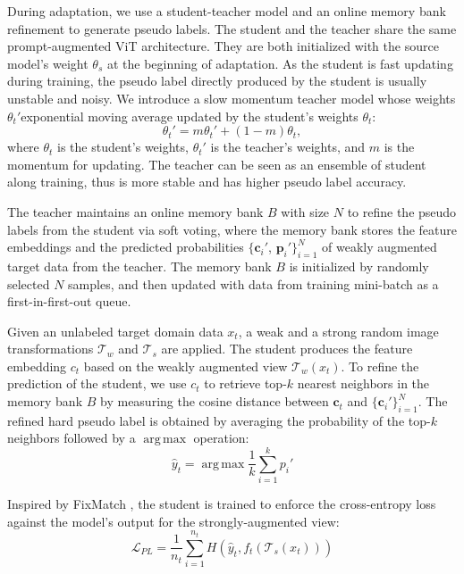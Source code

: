 \documentclass{article} \usepackage{iclr2023_conference,times}
\def\vc{{\bm{c}}}
\def\vp{{\bm{p}}}
\DeclareMathOperator*{\argmax}{arg\,max}
\begin{document}
During adaptation, we use a student-teacher model and an online memory bank refinement to generate pseudo labels. The student and the teacher share the same prompt-augmented ViT architecture. They are both initialized with the source model's weight $\theta_s$ at the beginning of adaptation. As the student is fast updating during training, the pseudo label directly produced by the student is usually unstable and noisy. We introduce a slow momentum teacher model whose weights $\theta_t'$exponential moving average updated by the student's weights $\theta_t$:
\begin{equation}
    \theta_t'=m\theta_t' + (1-m)\theta_t,
\end{equation}
where $\theta_t$ is the student's weights, $\theta_t'$ is the teacher's weights, and $m$ is the momentum for updating. The teacher can be seen as an ensemble of student along training, thus is more stable and has higher pseudo label accuracy.

The teacher maintains an online memory bank $B$ with size $N$ to refine the pseudo labels from the student via soft voting, where the memory bank stores the feature embeddings and the predicted probabilities $\{\displaystyle \vc_i'$, $\displaystyle \vp_i'\}_{i=1}^N$ of weakly augmented target data from the teacher. The memory bank $B$ is initialized by randomly selected $N$ samples, and then updated with data from training mini-batch as a first-in-first-out queue.

Given an unlabeled target domain data $x_t$, a weak and a strong random image transformations $\mathcal{T}_w$ and $\mathcal{T}_s$ are applied. The student produces the feature embedding $c_t$ based on the weakly augmented view $\mathcal{T}_w(x_t)$. To refine the prediction of the student, we use $c_t$ to retrieve top-$k$ nearest neighbors in the memory bank $B$ by measuring the cosine distance between $\displaystyle \vc_t$ and $\{\displaystyle \vc_i'\}_{i=1}^N$. The refined hard pseudo label is obtained by averaging the probability of the top-$k$ neighbors followed by a $\argmax$ operation:
\begin{equation}
    \hat{y}_t=\argmax \frac{1}{k}\sum_{i=1}^k p_i'
\end{equation}

Inspired by FixMatch \citep{sohn2020fixmatch}, the student is trained to enforce the cross-entropy loss against the model's output for the strongly-augmented view:
\begin{equation}
    \mathcal{L}_{PL}=\frac{1}{n_t}\sum_{i=1}^{n_t}H(\hat{y}_t, f_t(\mathcal{T}_s(x_t)))
\end{equation}
\end{document}
